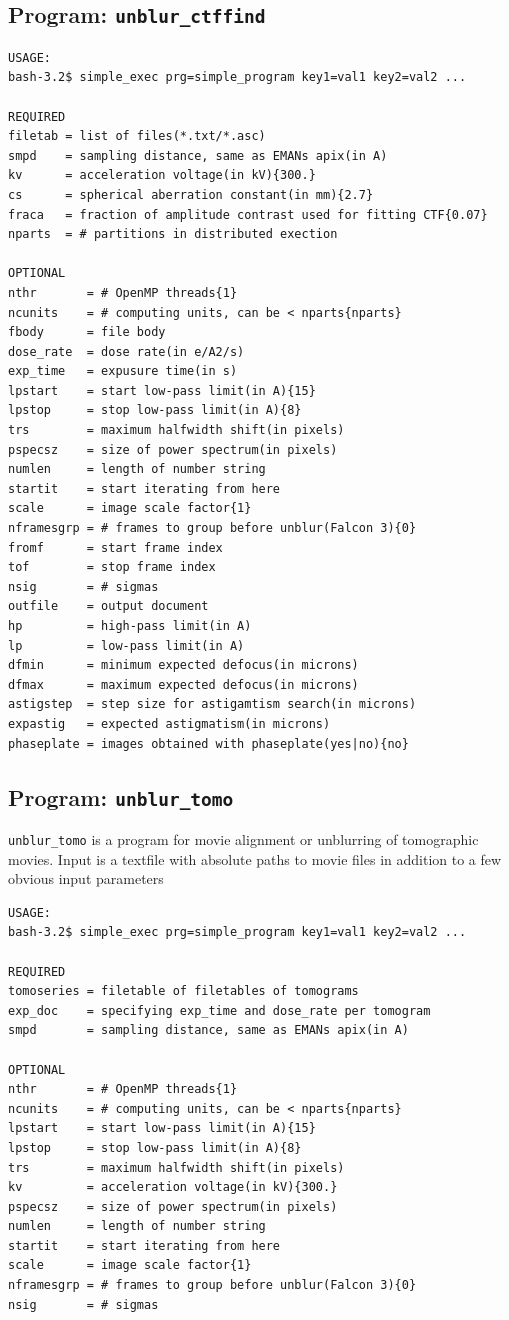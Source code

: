 \documentclass[a4paper,11pt]{article}
\newcommand{\prgname}[1]{\textcolor{NavyBlue}{\texttt{#1}}}
\begin{document}
\subsection{Program: \prgname{unblur\_ctffind}}
\label{unblur_ctffind}
\begin{verbatim}
USAGE:
bash-3.2$ simple_exec prg=simple_program key1=val1 key2=val2 ...

REQUIRED
filetab = list of files(*.txt/*.asc)
smpd    = sampling distance, same as EMANs apix(in A)
kv      = acceleration voltage(in kV){300.}
cs      = spherical aberration constant(in mm){2.7}
fraca   = fraction of amplitude contrast used for fitting CTF{0.07}
nparts  = # partitions in distributed exection

OPTIONAL
nthr       = # OpenMP threads{1}
ncunits    = # computing units, can be < nparts{nparts}
fbody      = file body
dose_rate  = dose rate(in e/A2/s)
exp_time   = expusure time(in s)
lpstart    = start low-pass limit(in A){15}
lpstop     = stop low-pass limit(in A){8}
trs        = maximum halfwidth shift(in pixels)
pspecsz    = size of power spectrum(in pixels)
numlen     = length of number string
startit    = start iterating from here
scale      = image scale factor{1}
nframesgrp = # frames to group before unblur(Falcon 3){0}
fromf      = start frame index
tof        = stop frame index
nsig       = # sigmas
outfile    = output document
hp         = high-pass limit(in A)
lp         = low-pass limit(in A)
dfmin      = minimum expected defocus(in microns)
dfmax      = maximum expected defocus(in microns)
astigstep  = step size for astigamtism search(in microns)
expastig   = expected astigmatism(in microns)
phaseplate = images obtained with phaseplate(yes|no){no}
\end{verbatim}

\subsection{Program: \prgname{unblur\_tomo}}
\label{unblur_tomo}
\prgname{unblur\_tomo} is a program for movie alignment or unblurring of tomographic movies. Input is a textfile with absolute paths to movie files in addition to a few obvious input parameters

\begin{verbatim}
USAGE:
bash-3.2$ simple_exec prg=simple_program key1=val1 key2=val2 ...

REQUIRED
tomoseries = filetable of filetables of tomograms
exp_doc    = specifying exp_time and dose_rate per tomogram
smpd       = sampling distance, same as EMANs apix(in A)

OPTIONAL
nthr       = # OpenMP threads{1}
ncunits    = # computing units, can be < nparts{nparts}
lpstart    = start low-pass limit(in A){15}
lpstop     = stop low-pass limit(in A){8}
trs        = maximum halfwidth shift(in pixels)
kv         = acceleration voltage(in kV){300.}
pspecsz    = size of power spectrum(in pixels)
numlen     = length of number string
startit    = start iterating from here
scale      = image scale factor{1}
nframesgrp = # frames to group before unblur(Falcon 3){0}
nsig       = # sigmas
\end{verbatim}

\def\bibfont{\footnotesize}


\end{document}

